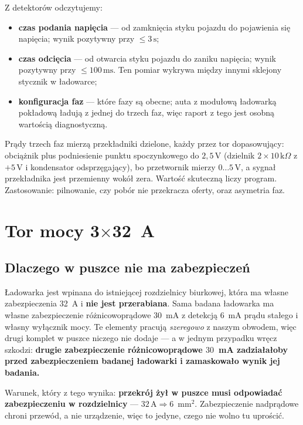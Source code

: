 \documentclass[a4paper,11pt]{article}
\newcommand{\kohm}{\,\mathrm{k}\Omega}
\newcommand{\volt}{\,\mathrm{V}}
\newcommand{\amp}{\,\mathrm{A}}
\newcommand{\ms}{\,\mathrm{ms}}
\newcommand{\sek}{\,\mathrm{s}}
\begin{document}
Z detektorów odczytujemy:

\begin{itemize}
\item \textbf{czas podania napięcia} --- od zamknięcia styku pojazdu do pojawienia
      się napięcia; wynik pozytywny przy $\le3\sek$;
\item \textbf{czas odcięcia} --- od otwarcia styku pojazdu do zaniku napięcia;
      wynik pozytywny przy $\le100\ms$. Ten pomiar wykrywa między innymi sklejony
      stycznik w ładowarce;
\item \textbf{konfiguracja faz} --- które fazy są obecne; auta z modułową ładowarką
      pokładową ładują z jednej do trzech faz, więc raport z tego jest osobną
      wartością diagnostyczną.
\end{itemize}

Prądy trzech faz mierzą przekładniki dzielone, każdy przez tor dopasowujący:
obciążnik plus podniesienie punktu spoczynkowego do $2{,}5\volt$ (dzielnik
$2\times10\kohm$ z $+5\volt$ i kondensator odsprzęgający), bo przetwornik mierzy
$0\ldots5\volt$, a sygnał przekładnika jest przemienny wokół zera. Wartość
skuteczną liczy program. Zastosowanie: pilnowanie, czy pobór nie przekracza oferty,
oraz asymetria faz.

\section{Tor mocy 3\texorpdfstring{$\times$}{x}32~A}

\subsection{Dlaczego w puszce nie ma zabezpieczeń}

Ładowarka jest wpinana do istniejącej rozdzielnicy biurkowej, która ma własne
zabezpieczenia 32~A i \textbf{nie jest przerabiana}. Sama badana ładowarka ma
własne zabezpieczenie różnicowoprądowe $30$~mA z detekcją $6$~mA prądu stałego
i własny wyłącznik mocy. Te elementy pracują \emph{szeregowo} z naszym obwodem,
więc drugi komplet w puszce niczego nie dodaje --- a w jednym przypadku wręcz
szkodzi: \textbf{drugie zabezpieczenie różnicowoprądowe $30$~mA zadziałałoby przed
zabezpieczeniem badanej ładowarki i zamaskowało wynik jej badania.}

Warunek, który z tego wynika: \textbf{przekrój żył w puszce musi odpowiadać
zabezpieczeniu w rozdzielnicy} --- $32\amp \Rightarrow 6$~mm$^2$. Zabezpieczenie
nadprądowe chroni przewód, a nie urządzenie, więc to jedyne, czego nie wolno tu
uprościć.
\end{document}
